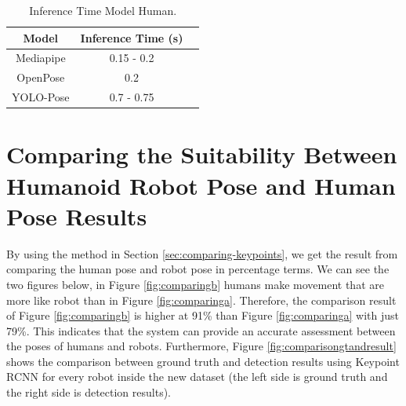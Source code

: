 \begin{longtable}{|c|c|c|}
  \caption{Inference Time Model Human.}
  \label{tb:inferencehuman}\\
  \hline
  \rowcolor[HTML]{C0C0C0}
  \textbf{Model}    & \textbf{Inference Time (s)} \\
  \hline
  Mediapipe   & 0.15 - 0.2\\
  \hline
  OpenPose    & 0.2\\
  \hline
  YOLO-Pose   & 0.7 - 0.75\\
  \hline
\end{longtable}

\section{Comparing the Suitability Between Humanoid Robot Pose and Human Pose Results}
\label{sec:comparingsuitabilityresults}

By using the method in Section \ref{sec:comparing-keypoints}, we get the result from comparing the human pose and robot pose in percentage terms.
We can see the two figures below, in Figure \ref{fig:comparingb} humans make movement that are more like robot than in Figure \ref{fig:comparinga}.
Therefore, the comparison result of Figure \ref{fig:comparingb} is higher at 91\% than Figure \ref{fig:comparinga} with just 79\%.
This indicates that the system can provide an accurate assessment between the poses of humans and robots.
Furthermore, Figure \ref{fig:comparisongtandresult} shows the comparison between ground truth and detection results using Keypoint RCNN for every robot inside the new dataset
(the left side is ground truth and the right side is detection results).

